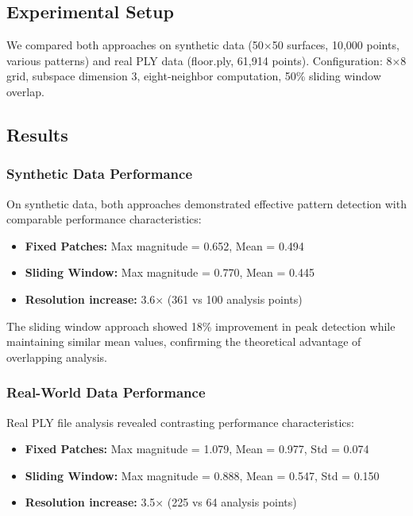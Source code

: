 \documentclass[../main.tex]{subfiles}
\begin{document}
\subsection{Experimental Setup}

We compared both approaches on synthetic data (50×50 surfaces, 10,000 points, various patterns) and real PLY data (floor.ply, 61,914 points). Configuration: 8×8 grid, subspace dimension 3, eight-neighbor computation, 50\% sliding window overlap.

\subsection{Results}

\subsubsection{Synthetic Data Performance}

On synthetic data, both approaches demonstrated effective pattern detection with comparable performance characteristics:
\begin{itemize}
    \item \textbf{Fixed Patches:} Max magnitude = 0.652, Mean = 0.494
    \item \textbf{Sliding Window:} Max magnitude = 0.770, Mean = 0.445
    \item \textbf{Resolution increase:} 3.6× (361 vs 100 analysis points)
\end{itemize}

The sliding window approach showed 18\% improvement in peak detection while maintaining similar mean values, confirming the theoretical advantage of overlapping analysis.

\subsubsection{Real-World Data Performance}

Real PLY file analysis revealed contrasting performance characteristics:
\begin{itemize}
    \item \textbf{Fixed Patches:} Max magnitude = 1.079, Mean = 0.977, Std = 0.074
    \item \textbf{Sliding Window:} Max magnitude = 0.888, Mean = 0.547, Std = 0.150
    \item \textbf{Resolution increase:} 3.5× (225 vs 64 analysis points)
\end{itemize}
\end{document}
